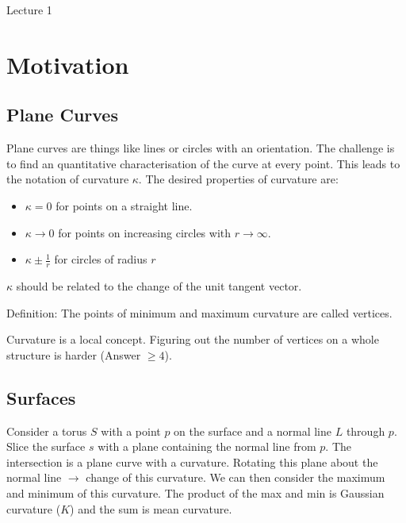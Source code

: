 \begin{center}

Lecture 1

\end{center}

\section{Motivation}

\subsection{Plane Curves}

Plane curves are things like lines or circles with an orientation. The challenge is to find an quantitative characterisation of the curve at every point. This leads to the notation of curvature $\kappa$. The desired properties of curvature are:

\begin{itemize} 

\item $\kappa = 0$ for points on a straight line.
\item $\kappa \rightarrow 0$ for points on increasing circles with $r \rightarrow \infty$.
\item $\kappa \pm \frac{1}{r}$ for circles of radius $r$

\end{itemize}

$\kappa$ should be related to the change of the unit tangent vector.

\vspace{\baselineskip}

Definition: The points of minimum and maximum curvature are called vertices.

Curvature is a local concept. Figuring out the number of vertices on a whole structure is harder (Answer $\geq 4$).

\subsection{Surfaces}

Consider a torus $S$ with a point $p$ on the surface and a normal line $L$ through $p$. Slice the surface $s$ with a plane containing the normal line from $p$. The intersection is a plane curve with a curvature. Rotating this plane about the normal line $\rightarrow$ change of this curvature. We can then consider the maximum and minimum of this curvature. The product of the max and min is Gaussian curvature ($K$) and the sum is mean curvature.

